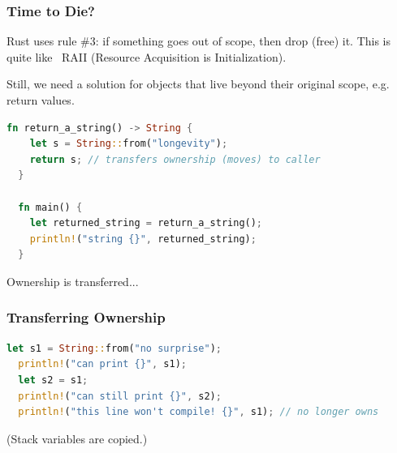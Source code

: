 \begin{frame}[fragile]
\frametitle{Time to Die?}

Rust uses rule \#3: if something goes out of scope, then drop (free) it.
This is quite like \CPP~RAII (Resource Acquisition is Initialization).

Still, we need a solution for objects that live beyond their original scope, e.g.
return values.
\begin{lstlisting}[language=Rust]
  fn return_a_string() -> String {
    let s = String::from("longevity");
    return s; // transfers ownership (moves) to caller
  }

  fn main() {
    let returned_string = return_a_string();
    println!("string {}", returned_string);
  }
\end{lstlisting}

Ownership is transferred...

\end{frame}


\begin{frame}[fragile]
\frametitle{Transferring Ownership}

\begin{lstlisting}[language=Rust]
  let s1 = String::from("no surprise");
  println!("can print {}", s1);
  let s2 = s1;
  println!("can still print {}", s2);
  println!("this line won't compile! {}", s1); // no longer owns
\end{lstlisting}

(Stack variables are copied.)

\end{frame}


